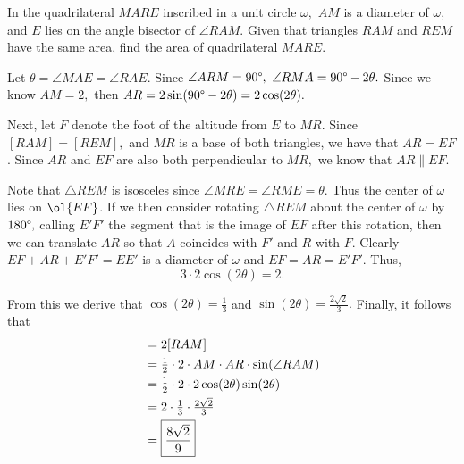 \documentclass[letterpaper,oneside]{scrartcl}
\begin{document}
\begin{problem*}
  In the quadrilateral $MARE$ inscribed in a unit circle $\omega,$ $AM$ is a diameter of $\omega,$ and $E$ lies on the angle bisector of $\angle RAM.$ Given that triangles $RAM$ and $REM$ have the same area, find the area of quadrilateral $MARE.$
\end{problem*}
\begin{soln}
  Let \(\theta = \angle MAE = \angle RAE\). Since \(\angle ARM = 90\degree,\) \(\angle RMA = 90\degree - 2\theta.\) Since we know \(AM = 2,\) then \(AR = 2\sin(90\degree - 2\theta) = 2\cos(2\theta).\)

  Next, let \(F\) denote the foot of the altitude from \(E\) to \(MR\). Since \([RAM] = [REM],\) and \(MR\) is a base of both triangles, we have that \(AR = EF\). Since \(AR\) and \(EF\) are also both perpendicular to \(MR,\) we know that \(AR \parallel EF.\) 
  
  Note that \(\triangle REM\) is isosceles since \(\angle MRE = \angle RME = \theta\). Thus the center of \(\omega\) lies on \(\ol{EF}\). If we then consider rotating \(\triangle REM\) about the center of \(\omega\) by \(180\degree,\) calling \(E'F'\) the segment that is the image of \(EF\) after this rotation, then we can translate \(AR\) so that \(A\) coincides with \(F'\) and \(R\) with \(F\). Clearly \(EF + AR +E'F' = EE'\) is a diameter of \(\omega\) and \(EF = AR = E'F'\). Thus, 
  \[3\cdot2\cos(2\theta) = 2.\]

  From this we derive that \(\cos(2\theta) = \frac13\) and \(\sin(2\theta) = \frac{2\sqrt2}{3}.\) Finally, it follows that 
  \begin{align*}
    [MARE] &= 2[RAM] \\
    &= \tfrac12 \cdot 2\cdot AM\cdot AR\cdot \sin(\angle RAM)\\
    &= \tfrac12\cdot2\cdot2\cos(2\theta)\sin(2\theta) \\
    &= 2\cdot\tfrac13\cdot\tfrac{2\sqrt2}{3} \\
    &= \fbox{$\displaystyle \frac{8\sqrt2}{9}$}
  \end{align*}
\end{soln}
\end{document}
